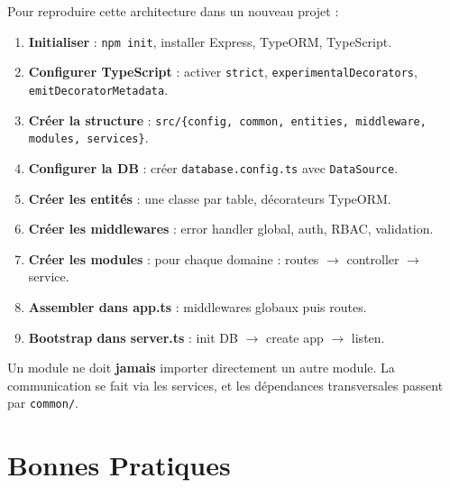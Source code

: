 \documentclass[12pt,a4paper]{report}
\begin{document}
Pour reproduire cette architecture dans un nouveau projet :

\begin{enumerate}
  \item \textbf{Initialiser} : \texttt{npm init}, installer Express, TypeORM, TypeScript.
  \item \textbf{Configurer TypeScript} : activer \texttt{strict}, \texttt{experimentalDecorators}, \texttt{emitDecoratorMetadata}.
  \item \textbf{Créer la structure} : \texttt{src/\{config, common, entities, middleware, modules, services\}}.
  \item \textbf{Configurer la DB} : créer \texttt{database.config.ts} avec \texttt{DataSource}.
  \item \textbf{Créer les entités} : une classe par table, décorateurs TypeORM.
  \item \textbf{Créer les middlewares} : error handler global, auth, RBAC, validation.
  \item \textbf{Créer les modules} : pour chaque domaine : routes $\to$ controller $\to$ service.
  \item \textbf{Assembler dans app.ts} : middlewares globaux puis routes.
  \item \textbf{Bootstrap dans server.ts} : init DB $\to$ create app $\to$ listen.
\end{enumerate}

\begin{infobox}[Règle d'or]
Un module ne doit \textbf{jamais} importer directement un autre module. La communication se fait via les services, et les dépendances transversales passent par \texttt{common/}.
\end{infobox}

\chapter{Bonnes Pratiques}
\end{document}
